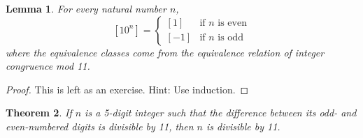 \documentclass[11pt]{article}
\newtheorem{theorem}{Theorem}
\newtheorem{lemma}[theorem]{Lemma}
\begin{document}
\begin{lemma}
	For every natural number $n$, 
	\[ [10^n] = \left\{ \begin{array}{rl}
		[1] & \text{if $n$ is even} \\ 
		\left[-1\right] & \text{if $n$ is odd}
	\end{array} \right. \]
where the equivalence classes come from the equivalence relation of integer congruence mod 11. 
\end{lemma}

\begin{proof}
	This is left as an exercise. Hint: Use induction. 
\end{proof}

\bigskip

\begin{theorem}
	If $n$ is a 5-digit integer such that the difference between its odd- and even-numbered digits is divisible by 11, then $n$ is divisible by 11. 
\end{theorem}
\end{document}
